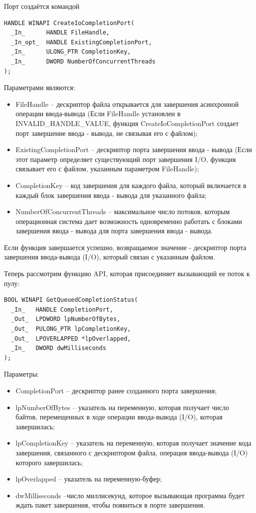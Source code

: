 \documentclass[a4paper, 12pt]{report}		%
\begin{document}
Порт создаётся командой\cite{MSDN1}
\begin{verbatim}
HANDLE WINAPI CreateIoCompletionPort(
  _In_      HANDLE FileHandle,
  _In_opt_  HANDLE ExistingCompletionPort,
  _In_      ULONG_PTR CompletionKey,
  _In_      DWORD NumberOfConcurrentThreads
);
\end{verbatim}

Параметрами являются:
\begin{itemize}
\item FileHandle -- дескриптор файла открывается  для завершения асинхронной операции ввода-вывода (Если FileHandle установлен в INVALID\_HANDLE\_VALUE, функция CreateIoCompletionPort создает порт завершение ввода - вывода, не связывая его с файлом);
\item ExistingCompletionPort -- дескриптор порта завершения ввода - вывода (Если этот параметр определяет существующий порт завершения I/O, функция связывает его с файлом, указанным параметром FileHandle);
\item CompletionKey -- код завершения для каждого файла, который включается в каждый блок завершения ввода - вывода для указанного файла;
\item NumberOfConcurrentThreads -- максимальное число потоков, которым операционная система дает возможность одновременно работать с блоками завершения ввода - вывода для порта завершения  ввода - вывода.
\end{itemize}

Если функция завершается успешно, возвращаемое значение - дескриптор порта завершения ввода-вывода (I/O), который связан с указанным файлом.

Теперь рассмотрим функцию API, которая присоединяет вызывающий ее поток к пулу\cite{MSDN2}:
\begin{verbatim}
BOOL WINAPI GetQueuedCompletionStatus(
  _In_   HANDLE CompletionPort,
  _Out_  LPDWORD lpNumberOfBytes,
  _Out_  PULONG_PTR lpCompletionKey,
  _Out_  LPOVERLAPPED *lpOverlapped,
  _In_   DWORD dwMilliseconds
);
\end{verbatim}

Параметры:
\begin{itemize}
\item CompletionPort -- дескриптор ранее созданного порта завершения;
\item lpNumberOfBytes -- указатель на переменную, которая получает число байтов, перемещенных в ходе операции ввода-вывода (I/O), которая завершилась;
\item lpCompletionKey -- указатель на переменную, которая получает значение кода завершения, связанного с дескриптором файла, операция ввода-вывода (I/O) которого завершилась;
\item lpOverlapped -- указатель на переменную-буфер;
\item dwMilliseconds --число миллисекунд, которое вызывающая программа будет ждать пакет завершения, чтобы появиться в порте завершения.
\end{itemize}
\end{document}
